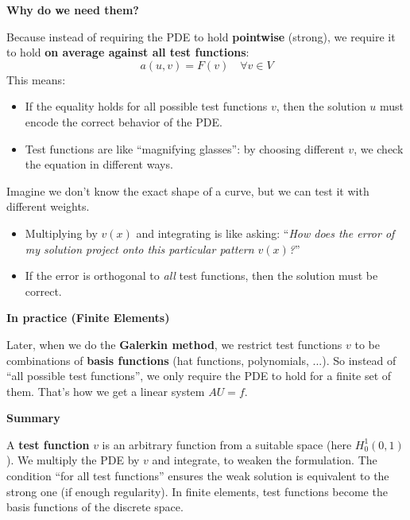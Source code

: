 \begin{enumerate}
\begin{deepeningbox}
        \begin{flushleft}
            \textcolor{Green3}{ \textbf{Why do we need them?}}
        \end{flushleft}
        Because instead of requiring the PDE to hold \textbf{pointwise} (strong), we require it to hold \textbf{on average against all test functions}:
        \begin{equation*}
            a(u,v) = F(v) \quad \forall v \in V    
        \end{equation*}
        This means:
        \begin{itemize}
            \item If the equality holds for all possible test functions $v$, then the solution $u$ must encode the correct behavior of the PDE.
            \item Test functions are like ``magnifying glasses'': by choosing different $v$, we check the equation in different ways.
        \end{itemize}

        \highspace
        \begin{examplebox}[: Analogy]
            Imagine we don't know the exact shape of a curve, but we can test it with different weights.
            \begin{itemize}
                \item Multiplying by $v(x)$ and integrating is like asking: ``\emph{How does the error of my solution project onto this particular pattern $v(x)$?}''
                \item If the error is orthogonal to \emph{all} test functions, then the solution must be correct.
            \end{itemize}
        \end{examplebox}

        \begin{flushleft}
            \textcolor{Green3}{ \textbf{In practice (Finite Elements)}}
        \end{flushleft}
        Later, when we do the \textbf{Galerkin method}, we restrict test functions $v$ to be combinations of \textbf{basis functions} (hat functions, polynomials, ...). So instead of ``all possible test functions'', we only require the PDE to hold for a finite set of them. That's how we get a linear system $AU=f$.

        \highspace
        \begin{flushleft}
            \textcolor{Green3}{ \textbf{Summary}}
        \end{flushleft}
        A \textbf{test function} $v$ is an arbitrary function from a suitable space (here $H^{1}_{0}(0,1)$). We multiply the PDE by $v$ and integrate, to weaken the formulation. The condition ``for all test functions'' ensures the weak solution is equivalent to the strong one (if enough regularity). In finite elements, test functions become the basis functions of the discrete space.
    \end{deepeningbox}



\end{enumerate}
